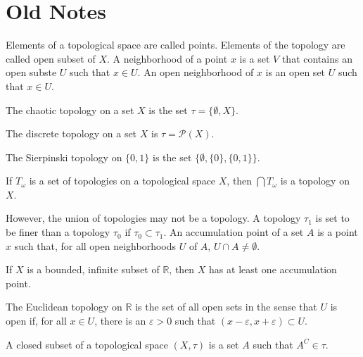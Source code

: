     \section{Old Notes}
        Elements of a topological space are called points.
        Elements of the topology are called open subset of $X$.
        A neighborhood of a point $x$ is a set $V$ that contains
        an open subste $U$ such that $x\in{U}$. An open neighborhood
        of $x$ is an open set $U$ such that $x\in{U}$.
        \begin{example}
            The chaotic topology on a set
            $X$ is the set $\tau=\{\emptyset,X\}$.
        \end{example}
        \begin{example}
            The discrete topology on a set $X$ is
            $\tau=\mathcal{P}(X)$.
        \end{example}
        \begin{example}
            The Sierpinski topology
            on $\{0,1\}$ is the set
            $\{\emptyset,\{0\},\{0,1\}\}$.
        \end{example}
        \begin{theorem}
            If $T_{\omega}$ is a set of topologies on
            a topological space $X$, then
            $\bigcap{T_{\omega}}$ is a topology on $X$.
        \end{theorem}
        However, the union of topologies may not be a
        topology. A topology $\tau_{1}$ is set to
        be finer than a topology $\tau_{0}$ if
        $\tau_{0}\subset\tau_{1}$. An accumulation point
        of a set $A$ is a point $x$ such that, for
        all open neighborhoods $U$ of $A$,
        $U\cap{A}\ne\emptyset$.
        \begin{theorem}
            If $X$ is a bounded, infinite subset of
            $\mathbb{R}$, then $X$ has at least
            one accumulation point.
        \end{theorem}
        \begin{definition}
            The Euclidean topology on
            $\mathbb{R}$ is the set of
            all open sets in the sense that
            $U$ is open if, for all $x\in{U}$,
            there is an $\varepsilon>0$ such
            that $(x-\varepsilon,x+\varepsilon)\subset{U}$.
        \end{definition}
        \begin{definition}
            A closed subset of a topological space
            $(X,\tau)$ is a set $A$ such that
            $A^{C}\in\tau$.
        \end{definition}
